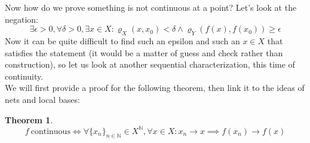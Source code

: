 \documentclass{exam}
\newtheorem{thm}{Theorem}[section]
\begin{document}
Now how do we prove something is not continuous at a point? Let's look at the negation:
\begin{equation*}
  \exists \epsilon > 0, \forall \delta > 0, \exists x \in X: \varrho_X(x, x_0) < \delta \land \varrho_Y(f(x), f(x_0)) \geqslant \epsilon
\end{equation*}
Now it can be quite difficult to find such an epsilon and such an $x \in X$ that satisfies the statement (it would be a matter of guess and check rather than construction), so let us look at another sequential characterization, this time of continuity.\\

We will first provide a proof for the following theorem, then link it to the ideas of nets and local bases:
\begin{thm}
\begin{equation*}
  f \ \text{continuous} \iff \forall \{x_n\}_{n \in \mathbb{N}} \in X^\mathbb{N}, \forall x \in X: x_n \xrightarrow{} x \implies f(x_n) \xrightarrow{} f(x)
\end{equation*}
\end{thm}
\end{document}

